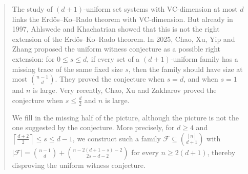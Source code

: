 \begin{abstract}
The study of \((d+1)\)-uniform set systems with VC-dimension at most \(d\) links the Erd\H{o}s--Ko--Rado theorem with VC-dimension. But already in 1997, Ahlswede and Khachatrian showed that this is not the right extension of the Erd\H{o}s--Ko--Rado theorem. In 2025, Chao, Xu, Yip and Zhang proposed the uniform witness conjecture as a possible right extension: for \(0\le s\le d\), if every set of a \((d+1)\)-uniform family has a missing trace of the same fixed size \(s\), then the family should have size at most \(\binom{n-1}{d}\). They proved the conjecture when \(s=d\), and when \(s=1\) and \(n\) is large. Very recently, Chao, Xu and Zakharov proved the conjecture when \(s\le \frac{d}{2}\) and \(n\) is large.

We fill in the missing half of the picture, although the picture is not the one suggested by the conjecture. More precisely, for \(d\ge4\) and \(\left\lceil \frac{d+2}{2}\right\rceil\le s\le d-1\), we construct such a family \(\mathcal{F}\subseteq\binom{[n]}{d+1}\) with
\(
|\mathcal{F}|=\binom{n-1}{d}+\binom{n-2(d+1-s)-2}{2s-d-2}
\)
for every \(n\ge2(d+1)\), thereby disproving the uniform witness conjecture.
\end{abstract}
